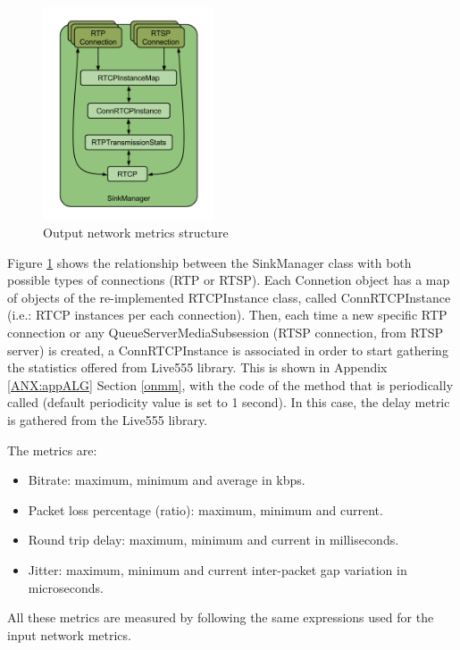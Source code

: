 \begin{figure}[!htb]
\begin{center}
\includegraphics[width=0.45\textwidth]{./images/SinkManager.png}
\caption{Output network metrics structure}
\label{F:onms}
\end{center}
\end{figure}

Figure \ref{F:onms} shows the relationship between the SinkManager class with both possible types of connections (RTP or RTSP). Each Connetion object has a map of objects of the re-implemented RTCPInstance class, called ConnRTCPInstance (i.e.: RTCP instances per each connection). Then, each time a new specific RTP connection or any QueueServerMediaSubsession (RTSP connection, from RTSP server) is created, a ConnRTCPInstance is associated in order to start gathering the statistics offered from Live555 library. This is shown in Appendix \ref{ANX:appALG} Section \ref{onmm}, with the code of the method that is periodically called (default periodicity value is set to 1 second). In this case, the delay metric is gathered from the Live555 library.

The metrics are:

\begin{itemize}
\item Bitrate: maximum, minimum and average in kbps.
\item Packet loss percentage (ratio): maximum, minimum and current.
\item Round trip delay: maximum, minimum and current in milliseconds.
\item Jitter: maximum, minimum and current inter-packet gap variation in microseconds.
\end{itemize}

All these metrics are measured by following the same expressions used for the input network metrics.


